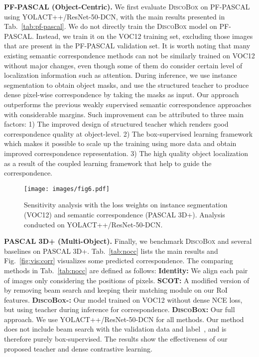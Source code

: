 \textbf{PF-PASCAL (Object-Centric).} We first evaluate \textsc{DiscoBox} on PF-PASCAL~\cite{ham2016proposal} using YOLACT++/ResNet-50-DCN, with the main results presented in Tab.~\ref{tab:pf-pascal}. We do not  directly train the \textsc{DiscoBox} model on PF-PASCAL. Instead, we train it on the VOC12 training set, excluding those images that are present in the PF-PASCAL validation set. It is worth noting that many existing semantic correspondence methods can not be similarly trained on VOC12 without major changes, even though some of them do consider certain level of localization information such as attention. During inference, we use instance segmentation to obtain object masks, and use the structured teacher to produce dense pixel-wise correspondence by taking the masks as input. Our approach outperforms the previous weakly supervised semantic correspondence approaches with considerable margins. Such improvement can be attributed to three main factors: 1) The improved design of structured teacher which renders good correspondence quality at object-level. 2) The box-supervised learning framework which makes it possible to scale up the training using more data and obtain improved correspondence representation. 3) The high quality object localization as a result of the coupled learning framework that help to guide the correspondence.

\begin{figure}[t]
\vspace{-0.1cm}
\centering
\texttt{[image: images/fig6.pdf]}
\caption{Sensitivity analysis with the loss weights on instance segmentation (VOC12) and semantic correspondence (PASCAL 3D+). Analysis conducted on YOLACT++/ResNet-50-DCN.}
\label{fig:alpha}
\end{figure}

\textbf{PASCAL 3D+ (Multi-Object).} Finally, we benchmark \textsc{DiscoBox} and several baselines on PASCAL 3D+. Tab.~\ref{tab:nocc} lists the main results and Fig.~\ref{fig:vis:corr} visualizes some predicted correspondence. The comparing methods in Tab.~\ref{tab:nocc} are defined as follows: \textbf{Identity:} We align each pair of images only considering the positions of pixels. \textbf{SCOT:} A modified version of~\cite{liu2020semantic} by removing beam search and keeping their matching module on our RoI features. \textbf{\textsc{DiscoBox-}:} Our model trained on VOC12 without dense NCE loss, but using teacher during inference for correspondence. \textbf{\textsc{DiscoBox}:} Our full approach. We use YOLACT++/ResNet-50-DCN for all methods. Our method does not include beam search with the validation data and label~\cite{liu2020semantic}, and is therefore purely box-supervised. The results show the effectiveness of our proposed teacher and dense contrastive learning.

